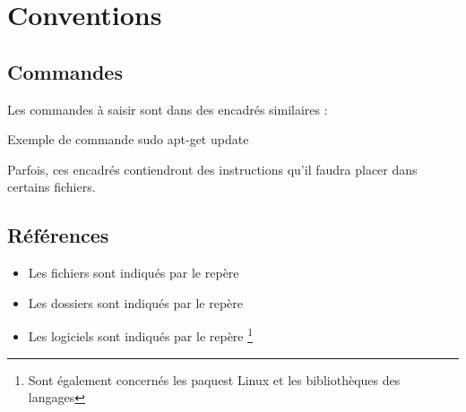 

\section{Conventions}


\subsection*{Commandes}
Les commandes à saisir sont dans des encadrés similaires : \\

\begin{Bash}{Exemple de commande}
sudo apt-get update
\end{Bash}

Parfois, ces encadrés contiendront des instructions qu'il faudra placer dans certains fichiers.


\subsection*{Références}

\begin{itemize}
    \item Les fichiers sont indiqués par le repère 
    \item Les dossiers sont indiqués par le repère 
    \item Les logiciels sont indiqués par le repère \footnote{Sont également concernés les paquest Linux et les bibliothèques des langages}
\end{itemize}

